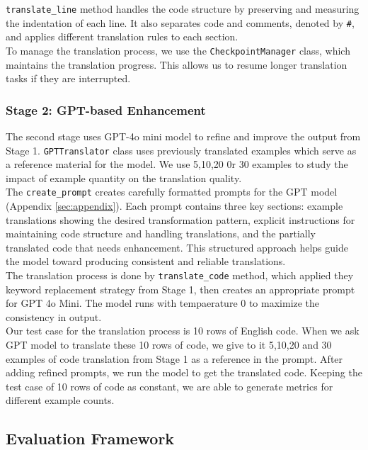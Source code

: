 \documentclass[11pt,a4paper]{article}
\begin{document}
\texttt{translate\_line} method handles the code structure by preserving and measuring the indentation of each line. It also separates code and comments, denoted by \texttt{\#}, and applies different translation rules to each section.\\

To manage the translation process, we use the \texttt{CheckpointManager} class, which maintains the translation progress. This allows us to resume longer translation tasks if they are interrupted.\\

\subsubsection{Stage 2: GPT-based Enhancement}
The second stage uses GPT-4o mini model \cite{gpt4omini} to refine and improve the output from Stage 1. \texttt{GPTTranslator} class uses previously translated examples which serve as a reference material for the model. We use 5,10,20 0r 30 examples to study the impact of example quantity on the translation quality.\\ 

The \texttt{create\_prompt} creates carefully formatted prompts for the GPT model (Appendix \ref{sec:appendix}). Each prompt contains three key sections: example translations showing the desired transformation pattern, explicit instructions for maintaining code structure and handling translations, and the partially translated code that needs enhancement. This structured approach helps guide the model toward producing consistent and reliable translations.\\ 

The translation process is done by \texttt{translate\_code} method, which applied they keyword replacement strategy from Stage 1, then creates an appropriate prompt for GPT 4o Mini. The model runs with tempaerature 0 to maximize the consistency in output.\\ 

Our test case for the translation process is 10 rows of English code. When we ask GPT model to translate these 10 rows of code, we give to it 5,10,20 and 30 examples of code translation from Stage 1 as a reference in the prompt. After adding refined prompts, we run the model to get the translated code. Keeping the test case of 10 rows of code as constant, we are able to generate metrics for different example counts.\\
\subsection{Evaluation Framework}
\end{document}
